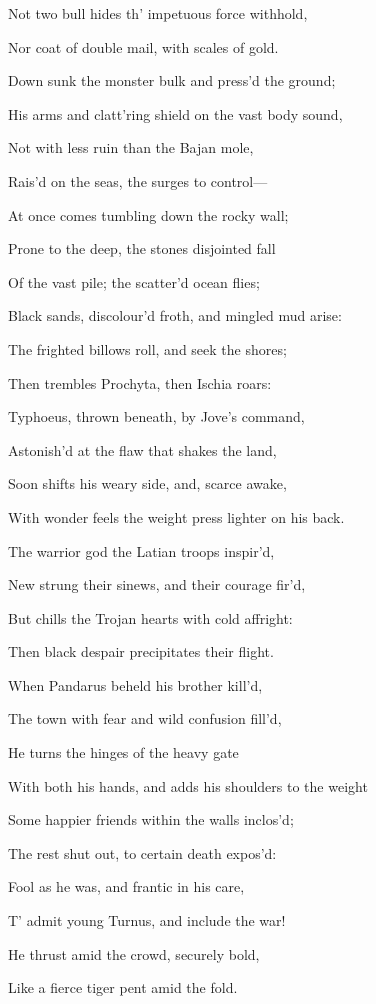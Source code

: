 Not two bull hides th’ impetuous force withhold,

Nor coat of double mail, with scales of gold.

Down sunk the monster bulk and press’d the ground;

His arms and clatt’ring shield on the vast body sound,

Not with less ruin than the Bajan mole,

Rais’d on the seas, the surges to control—

At once comes tumbling down the rocky wall;

Prone to the deep, the stones disjointed fall

Of the vast pile; the scatter’d ocean flies;

Black sands, discolour’d froth, and mingled mud arise:

The frighted billows roll, and seek the shores;

Then trembles Prochyta, then Ischia roars:

Typhoeus, thrown beneath, by Jove’s command,

Astonish’d at the flaw that shakes the land,

Soon shifts his weary side, and, scarce awake,

With wonder feels the weight press lighter on his back.

The warrior god the Latian troops inspir’d,

New strung their sinews, and their courage fir’d,

But chills the Trojan hearts with cold affright:

Then black despair precipitates their flight.

When Pandarus beheld his brother kill’d,

The town with fear and wild confusion fill’d,

He turns the hinges of the heavy gate

With both his hands, and adds his shoulders to the weight

Some happier friends within the walls inclos’d;

The rest shut out, to certain death expos’d:

Fool as he was, and frantic in his care,

T’ admit young Turnus, and include the war!

He thrust amid the crowd, securely bold,

Like a fierce tiger pent amid the fold.

